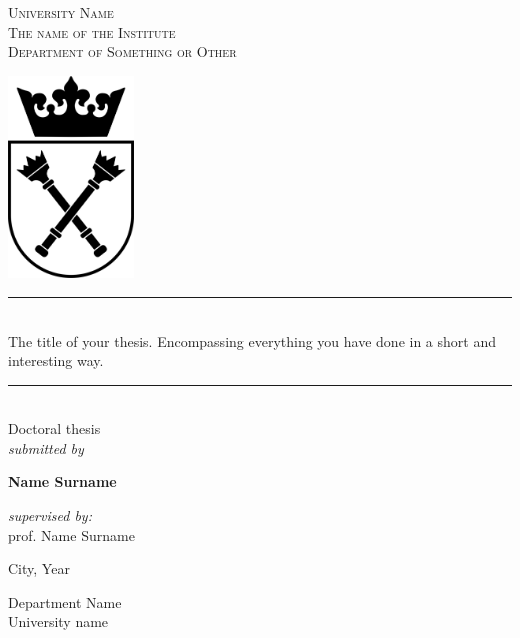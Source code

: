 \documentclass[11pt,twoside]{report}
\newcommand{\horrule}[1]{\rule{\linewidth}{#1}}
\begin{document}
	\begin{titlepage}
	\centering
	\Large
	\textsc{University Name \\ The name of the Institute \\ Department of Something or Other} \\ \vspace*{1\baselineskip}
	
	\includegraphics[width=0.25\textwidth,height=0.25\textheight,keepaspectratio]{uj_logo.jpg}
	
	\horrule{0.5pt} \\[0.4cm] %
	\Huge  The title of your thesis. Encompassing everything you have done in a short and interesting way. \\ 
	\horrule{2pt} \\[0.5cm] %
	
	\Large{Doctoral thesis \\ \textit{submitted by}}
	\vspace*{1\baselineskip}
	
	\LARGE \textbf{Name Surname} \\
		\vspace*{1\baselineskip}

	\Large{\textit{supervised by:} \\ prof. Name Surname \\}
		
	\vspace*{2\baselineskip}
	\Large{City, Year}
	
    \end{titlepage}
\shipout\null
\newpage
\thispagestyle{empty}
\vspace*{30px}
\begin{flushleft}
\large{Department Name\\
University name}
\end{flushleft}
\vspace*{1\baselineskip}
\end{document}
